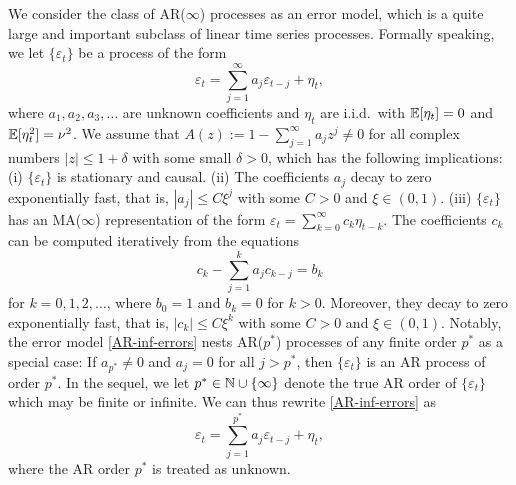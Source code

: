 We consider the class of AR($\infty$) processes as an error model, which is a quite large and important subclass of linear time series processes. Formally speaking, we let $\{\varepsilon_t\}$ be a process of the form 
\begin{equation}\label{AR-inf-errors} 
\varepsilon_t = \sum_{j=1}^\infty a_j \varepsilon_{t-j} + \eta_t, 
\end{equation} 
where $a_1,a_2,a_3,\ldots$ are unknown coefficients and $\eta_t$ are i.i.d.\ with $\mathbb{E}[\eta_t] = 0$ and $\mathbb{E}[\eta_t^2] = \nu^2$. We assume that $A(z) := 1 - \sum_{j=1}^{\infty} a_j z^j \ne 0$ for all complex numbers $|z| \le 1 + \delta$ with some small $\delta > 0$, which has the following implications: (i) $\{ \varepsilon_t \}$ is stationary and causal. (ii) The coefficients $a_j$ decay to zero exponentially fast, that is, $|a_j| \le C \xi^j$ with some $C > 0$ and $\xi \in (0,1)$. (iii) $\{ \varepsilon_t\}$ has an MA($\infty$) representation of the form $\varepsilon_t =  \sum_{k=0}^\infty c_k \eta_{t-k}$. The coefficients $c_k$ can be computed iteratively from the equations 
\begin{equation}\label{c-recursion}
c_k - \sum_{j=1}^k a_j c_{k-j} = b_k 
\end{equation}
for $k = 0,1,2,\ldots$, where $b_0 = 1$ and $b_k = 0$ for $k > 0$. Moreover, they decay to zero exponentially fast, that is, $|c_k| \le C \xi^k$ with some $C > 0$ and $\xi \in (0,1)$. Notably, the error model \eqref{AR-inf-errors} nests AR($p^*$) processes of any finite order $p^*$ as a special case: If $a_{p^*} \ne 0$ and $a_j = 0$ for all $j > p^*$, then $\{ \varepsilon_t \}$ is an AR process of order $p^*$. In the sequel, we let $p^* \in \mathbb{N} \cup \{ \infty \}$ denote the true AR order of $\{\varepsilon_t\}$ which may be finite or infinite. We can thus rewrite \eqref{AR-inf-errors} as 
\begin{equation}\label{AR-errors} 
\varepsilon_t = \sum_{j=1}^{p^*} a_j \varepsilon_{t-j} + \eta_t, 
\end{equation} 
where the AR order $p^*$ is treated as unknown. 



